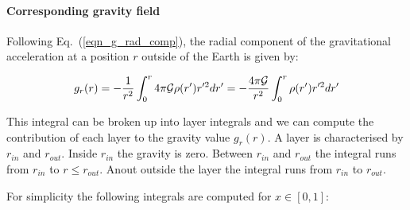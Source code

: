 \paragraph{Corresponding gravity field} Following Eq.~(\ref{eqn_g_rad_comp}), the radial component of the gravitational 
acceleration at a position $r$ outside of the Earth is given by:

\begin{equation}
g_r(r) 
= - \frac{1}{r^2} \int_0^r 4\pi {\cal G} \rho(r') r'^2 dr'
= - \frac{4 \pi {\cal G}}{r^2} \int_0^r \rho(r') r'^2 dr'
\end{equation}
 
This integral can be broken up into layer integrals and we can compute the contribution 
of each layer to the gravity value $g_r(r)$.
A layer is characterised by $r_{in}$ and $r_{out}$. Inside $r_{in}$ the gravity is zero. 
Between $r_{in}$ and $r_{out}$ the integral runs from $r_{in}$ to $r\leq r_{out}$. 
Anout outside the layer the integral runs from $r_{in}$ to $r_{out}$.

For simplicity the following integrals are computed for $x\in[0,1]$:

